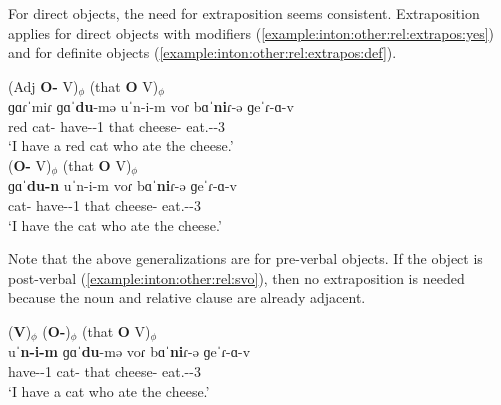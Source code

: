 For direct objects, the need for extraposition seems consistent. Extraposition applies for   direct objects  with modifiers (\ref{example:inton:other:rel:extrapos:yes}) and   for definite objects (\ref{example:inton:other:rel:extrapos:def}). 


\begin{exe}
	\ex \begin{xlist}
		\ex \glll  (Adj {{\textbf{O-{\indf}}}} V)$_\phi$  (that {\textbf{O}} V)$_\phi$ \\
		{ɡɑɾˈmiɾ} {{ɡɑˈ\textbf{du}-mə}} {uˈ{n-i-m}} voɾ {{bɑˈ\textbf{ni}ɾ-ə}} {ɡeˈɾ-ɑ-v} 
		\\
		red cat-{\indf} have-{\thgloss}-1{\sg}  that cheese-{} eat.{\aorperf}-{\pst}-3{\sg} 
		\\
		\trans `I have a red cat who ate the cheese.'
		\label{example:inton:other:rel:extrapos:yes}
		\\
		\ex \glll ({{\textbf{O-{}}}} V)$_\phi$  (that {\textbf{O}} V)$_\phi$ \\ 
		{{ɡɑˈ\textbf{du-n}}} {uˈ{n-i-m}} voɾ {{bɑˈ\textbf{ni}ɾ-ə}} {ɡeˈɾ-ɑ-v} 
		\\
		cat-{} have-{\thgloss}-1{\sg}  that cheese-{} eat.{\aorperf}-{\pst}-3{\sg} 
		\\
		\trans `I have the   cat who ate the cheese.'
		\label{example:inton:other:rel:extrapos:def}
		\\
	\end{xlist}
\end{exe}

Note that the above generalizations are for pre-verbal objects. If the object is post-verbal (\ref{example:inton:other:rel:svo}), then no extraposition is  needed because the noun and relative clause are already adjacent. 

\begin{exe}
	\ex \glll  (\textbf{V})$_\phi$  ({{\textbf{O-{\indf}}}})$_\phi$  (that {\textbf{O}} V)$_\phi$ \\
	uˈ\textbf{n-i-m}	 {{ɡɑˈ\textbf{du}-mə}}  voɾ {{bɑˈ\textbf{ni}ɾ-ə}} {ɡeˈɾ-ɑ-v} 
	\\
	have-{\thgloss}-1{\sg}  cat-{\indf}    that cheese-{} eat.{\aorperf}-{\pst}-3{\sg} 
	\\
	\trans `I have  a cat   who ate the cheese.'
	\label{example:inton:other:rel:svo}
	\\
\end{exe}




